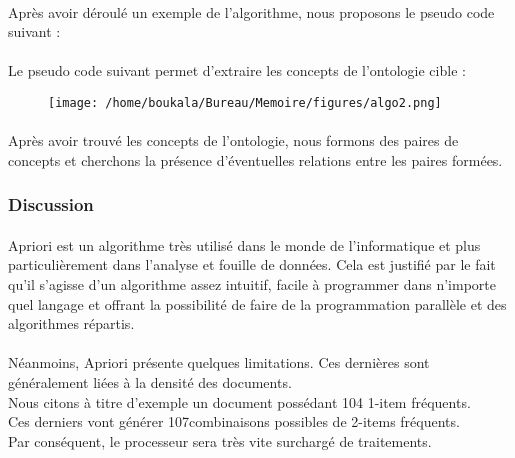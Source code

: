 \documentclass[12pt, a4paper, oneside]{book}
\begin{document}
\paragraph{}
Après avoir déroulé un exemple de l'algorithme, nous proposons le pseudo code suivant :
\paragraph{} 
Le pseudo code suivant permet d'extraire les concepts de l'ontologie cible : 

\begin{figure}[h!]
\begin{center}
\texttt{[image: /home/boukala/Bureau/Memoire/figures/algo2.png]}
\end{center}
\end{figure}


\paragraph{}
Après avoir trouvé les concepts de l'ontologie, nous formons des paires de concepts et cherchons la présence d'éventuelles relations entre les paires formées.

\subsubsection{Discussion}

\paragraph{}
Apriori est un algorithme très utilisé dans le monde de l'informatique et plus particulièrement dans l'analyse et fouille de données.
Cela est justifié par le fait qu'il s'agisse d'un algorithme assez intuitif, facile à programmer dans n'importe quel langage et offrant la possibilité de faire de la programmation parallèle et des algorithmes répartis.
\paragraph{}
Néanmoins, Apriori présente quelques limitations. Ces dernières sont généralement liées à la densité des documents.\\
Nous citons à titre d'exemple un document possédant  104 1-item fréquents.\\
Ces derniers vont générer 107combinaisons possibles de 2-items fréquents.\\
Par conséquent, le processeur sera très vite surchargé de traitements.
\end{document}
